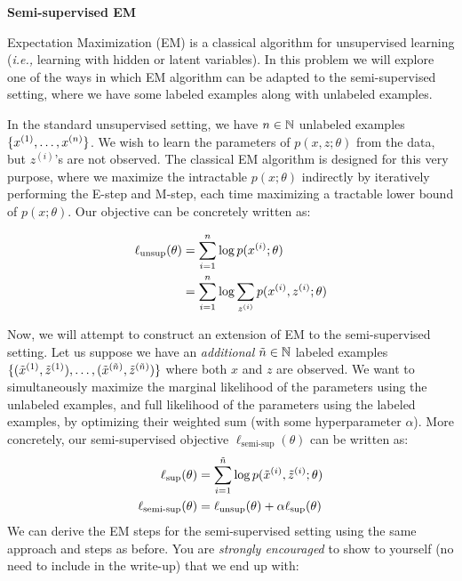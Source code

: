 \item {} {\bf Semi-supervised EM}

\def\zsi{z^{(i)}}
\def\xsi{x^{(i)}}

Expectation Maximization (EM) is a classical algorithm for unsupervised learning (\emph{i.e.,} learning with hidden or latent variables). In this problem we will explore one of the ways in which EM algorithm can be adapted to the semi-supervised setting, where we have some labeled examples along with unlabeled examples.

In the standard unsupervised setting, we have ${n} \in \mathbb{N}$ unlabeled examples $\{x^{(1)},\ldots,x^{({n})}\}$. We wish to learn the parameters of $p(x,z;\theta)$ from the data, but $\zsi$'s are not observed. The classical EM algorithm is designed for this very purpose, where we maximize the intractable $p(x;\theta)$ indirectly by iteratively performing the E-step and M-step, each time maximizing a tractable lower bound of $p(x;\theta)$. Our objective can be concretely written as:

\begin{align*}
    \ell_{\text{unsup}}(\theta) &= \sum_{i=1}^\nexp \log p(\xsi;\theta) \\
    &= \sum_{i=1}^\nexp \log \sum_{\zsi} p(\xsi,\zsi;\theta)
\end{align*}


Now, we will attempt to construct an extension of EM to the semi-supervised setting. Let us suppose we have an \emph{additional} $\tilde{{n}} \in \mathbb{N}$ labeled examples $\{(\tilde{x}^{(1)},\tilde{z}^{(1)}),\ldots,(\tilde{x}^{(\tilde{{n}})},\tilde{z}^{(\tilde{{n}})})\}$ where both $x$ and $z$ are observed. We want to simultaneously maximize the marginal likelihood of the parameters using the unlabeled examples, and full likelihood of the parameters using the labeled examples, by optimizing their weighted sum (with some hyperparameter $\alpha$). More concretely, our semi-supervised objective $\ell_\text{semi-sup}(\theta)$ can be written as:
%
\begin{align*}
    \ell_\text{sup}(\theta) &= \sum_{i=1}^{\tilde{{n}}} \log p(\tilde{x}^{(i)},\tilde{z}^{(i)};\theta) \\
    \ell_{\text{semi-sup}}(\theta) &= \ell_\text{unsup}(\theta) + \alpha \ell_\text{sup}(\theta)
\end{align*}
%
We can derive the EM steps for the semi-supervised setting using the same approach and steps as before. You are \emph{strongly encouraged} to show to yourself (no need to include in the write-up) that we end up with:


